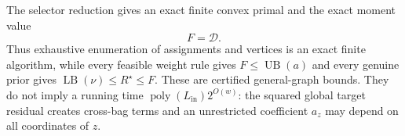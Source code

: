 The selector reduction gives an exact finite convex primal and the exact moment value
\[
 F=\mathcal D.
\]
Thus exhaustive enumeration of assignments and vertices is an exact finite algorithm, while every feasible weight rule gives \(F\le\operatorname{UB}(a)\) and every genuine prior gives \(\operatorname{LB}(\nu)\le R^{\star}\le F\).  These are certified general-graph bounds.  They do not imply a running time \(\operatorname{poly}(L_{\mathrm{in}})2^{O(w)}\): the squared global target residual creates cross-bag terms and an unrestricted coefficient \(a_z\) may depend on all coordinates of \(z\).